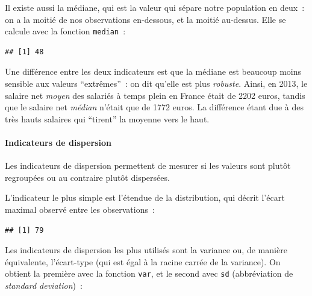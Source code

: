 \documentclass[12pt,]{book}
\newenvironment{Shaded}{\begin{snugshade}}{\end{snugshade}}
\newcommand{\KeywordTok}[1]{\textcolor[rgb]{0.27,0.27,0.27}{\textbf{#1}}}
\newcommand{\NormalTok}[1]{#1}
\newcommand{\OperatorTok}[1]{\textcolor[rgb]{0.43,0.43,0.43}{\textbf{#1}}}
\newcommand{\StringTok}[1]{\textcolor[rgb]{0.5,0.5,0.5}{#1}}
\let\oldparagraph\paragraph
\renewcommand{\paragraph}[1]{\oldparagraph{#1}\mbox{}}
\begin{document}
Il existe aussi la médiane, qui est la valeur qui sépare notre population en deux~: on a la moitié de nos observations en-dessous, et la moitié au-dessus. Elle se calcule avec la fonction \texttt{median}~:

\begin{Shaded}
\end{Shaded}

\begin{verbatim}
## [1] 48
\end{verbatim}

Une différence entre les deux indicateurs est que la médiane est beaucoup moins sensible aux valeurs ``extrêmes''~: on dit qu'elle est plus \emph{robuste}. Ainsi, en 2013, le salaire net \emph{moyen} des salariés à temps plein en France était de 2202 euros, tandis que le salaire net \emph{médian} n'était que de 1772 euros. La différence étant due à des très hauts salaires qui ``tirent'' la moyenne vers le haut.

\hypertarget{indicateurs-de-dispersion}{%
\paragraph{Indicateurs de dispersion}\label{indicateurs-de-dispersion}}

Les indicateurs de dispersion permettent de mesurer si les valeurs sont plutôt regroupées ou au contraire plutôt dispersées.

L'indicateur le plus simple est l'étendue de la distribution, qui décrit l'écart maximal observé entre les observations~:

\begin{Shaded}
\end{Shaded}

\begin{verbatim}
## [1] 79
\end{verbatim}

Les indicateurs de dispersion les plus utilisés sont la variance ou, de manière équivalente, l'écart-type (qui est égal à la racine carrée de la variance). On obtient la première avec la fonction \texttt{var}, et le second avec \texttt{sd} (abbréviation de \emph{standard deviation})~:
\end{document}
